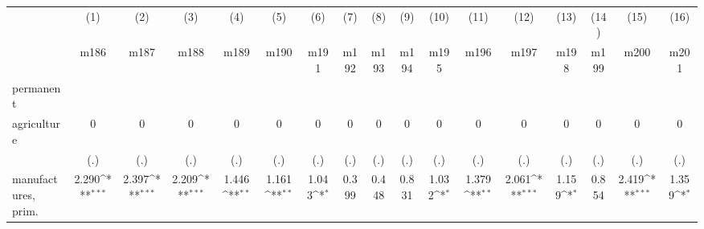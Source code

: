 {
\def\sym#1{\ifmmode^{#1}\else\(^{#1}\)\fi}
\begin{tabular}{l*{16}{c}}
\hline\hline
                    &\multicolumn{1}{c}{(1)}&\multicolumn{1}{c}{(2)}&\multicolumn{1}{c}{(3)}&\multicolumn{1}{c}{(4)}&\multicolumn{1}{c}{(5)}&\multicolumn{1}{c}{(6)}&\multicolumn{1}{c}{(7)}&\multicolumn{1}{c}{(8)}&\multicolumn{1}{c}{(9)}&\multicolumn{1}{c}{(10)}&\multicolumn{1}{c}{(11)}&\multicolumn{1}{c}{(12)}&\multicolumn{1}{c}{(13)}&\multicolumn{1}{c}{(14)}&\multicolumn{1}{c}{(15)}&\multicolumn{1}{c}{(16)}\\
                    &\multicolumn{1}{c}{m186}&\multicolumn{1}{c}{m187}&\multicolumn{1}{c}{m188}&\multicolumn{1}{c}{m189}&\multicolumn{1}{c}{m190}&\multicolumn{1}{c}{m191}&\multicolumn{1}{c}{m192}&\multicolumn{1}{c}{m193}&\multicolumn{1}{c}{m194}&\multicolumn{1}{c}{m195}&\multicolumn{1}{c}{m196}&\multicolumn{1}{c}{m197}&\multicolumn{1}{c}{m198}&\multicolumn{1}{c}{m199}&\multicolumn{1}{c}{m200}&\multicolumn{1}{c}{m201}\\
\hline
permanent           &                     &                     &                     &                     &                     &                     &                     &                     &                     &                     &                     &                     &                     &                     &                     &                     \\
agriculture         &           0         &           0         &           0         &           0         &           0         &           0         &           0         &           0         &           0         &           0         &           0         &           0         &           0         &           0         &           0         &           0         \\
                    &         (.)         &         (.)         &         (.)         &         (.)         &         (.)         &         (.)         &         (.)         &         (.)         &         (.)         &         (.)         &         (.)         &         (.)         &         (.)         &         (.)         &         (.)         &         (.)         \\
[1em]
manufactures, prim. &       2.290\sym{***}&       2.397\sym{***}&       2.209\sym{***}&       1.446\sym{**} &       1.161\sym{**} &       1.043\sym{*}  &       0.399         &       0.448         &       0.831         &       1.032\sym{*}  &       1.379\sym{**} &       2.061\sym{***}&       1.159\sym{*}  &       0.854         &       2.419\sym{***}&       1.359\sym{*}  \\

\end{tabular}}
